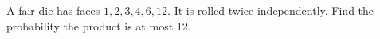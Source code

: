 A fair die has faces $1,2,3,4,6,12$. It is rolled twice independently. Find the probability the product is at most 12.
